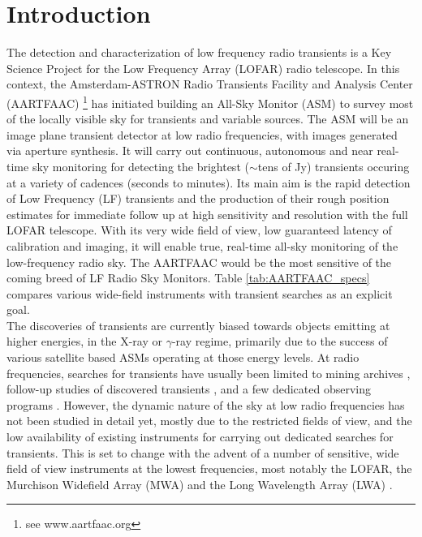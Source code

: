 \documentclass{aa}
\begin{document}

\maketitle

\section{\label{sec:Introduction}Introduction}
The detection  and characterization of low  frequency radio transients  is a Key
Science  Project \citep{fender2006lofar}  for  the Low  Frequency Array  (LOFAR)
\citep{vanhaarlem2013lofar}   radio    telescope.    In   this    context,   the
Amsterdam-ASTRON    Radio    Transients    Facility    and    Analysis    Center
(AARTFAAC) \footnote{see  www.aartfaac.org }  has initiated building  an All-Sky
Monitor  (ASM) to  survey most  of the  locally visible  sky for  transients and
variable sources.   The ASM  will be  an image plane  transient detector  at low
radio frequencies, with images generated  via aperture synthesis.  It will carry
out continuous, autonomous  and near real-time sky monitoring  for detecting the
brightest  ($\sim$tens of  Jy)  transients  occuring at  a  variety of  cadences
(seconds to minutes). Its main aim  is the rapid detection of Low Frequency (LF)
transients and  the production of  their rough position estimates  for immediate
follow up at high sensitivity and resolution with the full LOFAR telescope. With
its very wide field of view,  low guaranteed latency of calibration and imaging,
it will  enable true,  real-time all-sky monitoring  of the  low-frequency radio
sky. The AARTFAAC  would be the most  sensitive of the coming breed  of LF Radio
Sky  Monitors.   Table   \ref{tab:AARTFAAC_specs}  compares  various  wide-field
instruments with transient searches as an explicit goal.\\

The discoveries of  transients are currently biased towards  objects emitting at
higher  energies, in  the X-ray  or $\gamma$-ray  regime, primarily  due  to the
success of  various satellite  based ASMs operating  at those energy  levels. At
radio frequencies, searches  for transients have usually been  limited to mining
archives  \citep{bower2007submillijansky, bower2011search}, follow-up  studies of
discovered  transients \citep{chandra2012radio}, and  a few  dedicated observing
programs  \citep{bannister2012limits,  katz2003survey}.  However,  the  dynamic
nature of the sky  at low radio frequencies has not been  studied in detail yet,
mostly  due to  the  restricted fields  of  view, and  the  low availability  of
existing instruments  for carrying out dedicated searches  for transients.  This
is set to  change with the advent of  a number of sensitive, wide  field of view
instruments at  the lowest  frequencies, most notably  the LOFAR,  the Murchison
Widefield  Array  (MWA) \citep{lonsdale2009murchison}  and  the Long  Wavelength
Array (LWA) \citep{ellingson2009long}.
\end{document}
